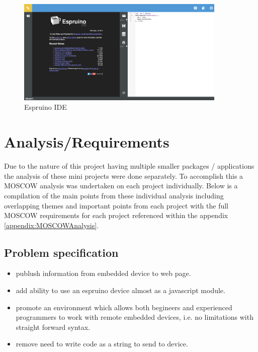 \documentclass{l4proj}
\begin{document}
\begin{figure}[!ht]
    \centering
    \includegraphics[width=10cm]{dissertation/images/espruino-ide.png}
    \caption{Espruino IDE}
    \label{fig:espruino-ide}
\end{figure}

\chapter{Analysis/Requirements}

\text Due to the nature of this project having multiple smaller packages / applications the analysis of these mini projects were done separately. To accomplish this a MOSCOW analysis was undertaken on each project individually. Below is a compilation of the main points from these individual analysis including overlapping themes and important points from each project with the full MOSCOW requirements for each project referenced within the appendix \ref{appendix:MOSCOWAnalysis}.

\section{Problem specification}

\begin{itemize}
    \item publush information from embedded device to web page.
    \item add ability to use an espruino device almost as a javascript module.
    \item promote an environment which allows both begineers and experienced programmers to work with remote embedded devices, i.e. no limitations with straight forward syntax.
    \item remove need to write code as a string to send to device.
\end{itemize}
\end{document}

